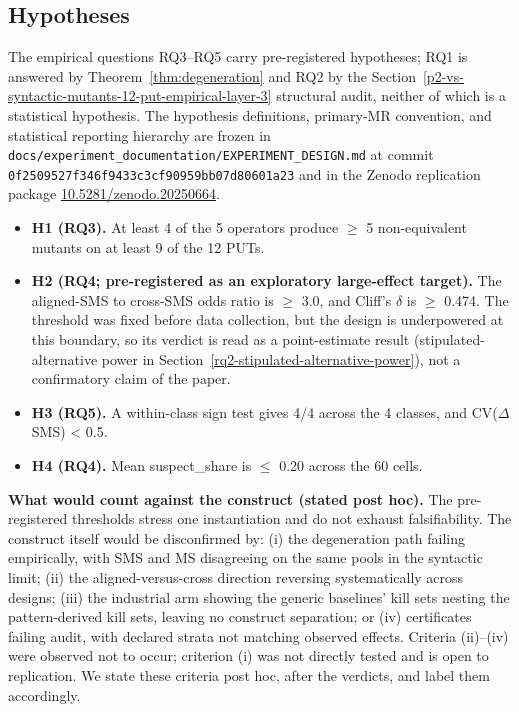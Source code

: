 \documentclass[manuscript,screen,review]{acmart}
\begin{document}
\subsection{Hypotheses}\label{hypotheses}

The empirical questions RQ3--RQ5 carry pre-registered hypotheses; RQ1 is
answered by Theorem~\ref{thm:degeneration} and RQ2 by the Section~\ref{p2-vs-syntactic-mutants-12-put-empirical-layer-3} structural audit, neither of
which is a statistical hypothesis.
The hypothesis definitions, primary-MR convention, and statistical
reporting hierarchy are frozen in
\texttt{docs/experiment\_documentation/EXPERIMENT\_DESIGN.md} at commit
\texttt{0f2509527f346f9433c3cf90959bb07d80601a23} and in the Zenodo
replication package
\href{https://doi.org/10.5281/zenodo.20250664}{10.5281/zenodo.20250664}.

\begin{itemize}

\item
  \textbf{H1 (RQ3).} At least 4 of the 5 operators produce $\geq$ 5 non-equivalent
  mutants on at least 9 of the 12 PUTs.
\item
  \textbf{H2 (RQ4; pre-registered as an exploratory large-effect
  target).} The aligned-SMS to
  cross-SMS odds ratio is $\geq$ 3.0, and Cliff's $\delta$ is $\geq$ 0.474.
  The threshold was fixed before data collection, but the design is
  underpowered at this boundary, so its verdict is read as a
  point-estimate result
  (stipulated-alternative power in Section~\ref{rq2-stipulated-alternative-power}), not
  a confirmatory claim of the paper.
\item
  \textbf{H3 (RQ5).} A within-class sign test gives 4/4 across the 4 classes,
  and CV($\Delta$SMS) \textless{} 0.5.
\item
  \textbf{H4 (RQ4).} Mean suspect\_share is $\leq$ 0.20 across the 60 cells.
\end{itemize}

\textbf{What would count against the construct (stated post hoc).} The
pre-registered thresholds stress one instantiation and do not exhaust
falsifiability. The construct itself would be disconfirmed by: (i) the
degeneration path failing empirically, with SMS and MS disagreeing on
the same pools in the syntactic limit; (ii) the aligned-versus-cross
direction reversing systematically across designs; (iii) the industrial
arm showing the generic baselines' kill sets nesting the pattern-derived
kill sets, leaving no construct separation; or (iv) certificates failing
audit, with declared strata not matching observed effects. Criteria
(ii)--(iv) were observed not to occur; criterion (i) was not directly
tested and is open to replication. We state these criteria post hoc,
after the verdicts, and label them accordingly.
\end{document}
